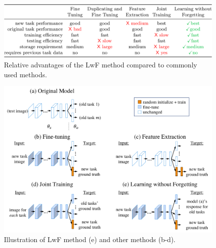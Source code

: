 \documentclass[a4paper,twocolumn]{article}
\begin{document}
\begin{figure}[t]
    \includegraphics[width=\textwidth]{table.png}
    \caption{Relative advantages of the LwF method compared to commonly used methods.}
    \label{fig:table}
\end{figure}
\begin{figure}[t]
    \includegraphics[width=\textwidth]{methods.png}
    \caption{Illustration of LwF method (e) and other methods (b-d).}
    \label{fig:methods}
\end{figure}
\end{document}
